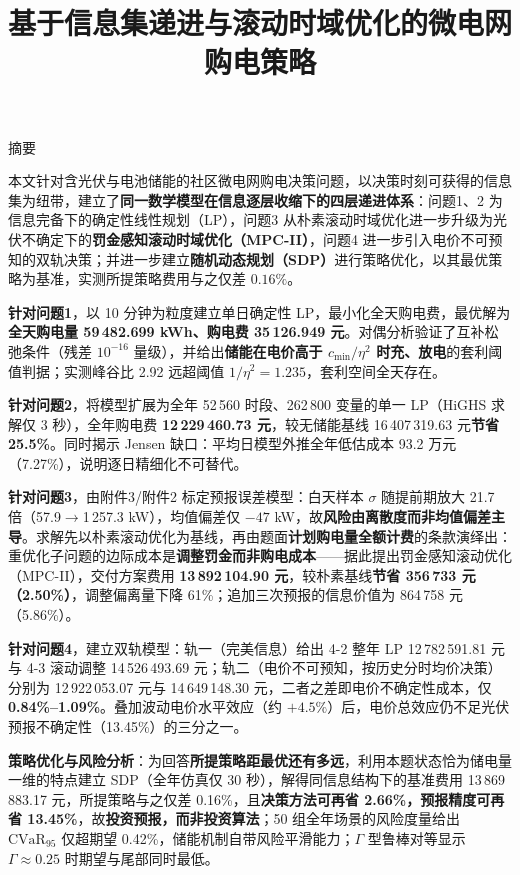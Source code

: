 \documentclass[11pt,a4paper]{ctexart}
\title{\heiti 基于信息集递进与滚动时域优化的微电网购电策略}
\author{}
\date{}
\newcommand{\CVaR}{\mathrm{CVaR}}
\begin{document}
\maketitle
\vspace{-3.5em}

\begin{center}{\large\heiti 摘\quad 要}\end{center}

本文针对含光伏与电池储能的社区微电网购电决策问题，以决策时刻可获得的信息集为纽带，建立了\textbf{同一数学模型在信息逐层收缩下的四层递进体系}：问题1、2 为信息完备下的确定性线性规划（LP），问题3 从朴素滚动时域优化进一步升级为光伏不确定下的\textbf{罚金感知滚动时域优化（MPC-II）}，问题4 进一步引入电价不可预知的双轨决策；并进一步建立\textbf{随机动态规划（SDP）}进行策略优化，以其最优策略为基准，实测所提策略费用与之仅差 $0.16\%$。

\textbf{针对问题1}，以 10 分钟为粒度建立单日确定性 LP，最小化全天购电费，最优解为\textbf{全天购电量 59\,482.699 kWh、购电费 35\,126.949 元}。对偶分析验证了互补松弛条件（残差 $10^{-16}$ 量级），并给出\textbf{储能在电价高于 $c_{\min}/\eta^2$ 时充、放电}的套利阈值判据；实测峰谷比 2.92 远超阈值 $1/\eta^2=1.235$，套利空间全天存在。

\textbf{针对问题2}，将模型扩展为全年 52\,560 时段、262\,800 变量的单一 LP（HiGHS 求解仅 3 秒），全年购电费 \textbf{12\,229\,460.73 元}，较无储能基线 16\,407\,319.63 元\textbf{节省 25.5\%}。同时揭示 Jensen 缺口：平均日模型外推全年低估成本 93.2 万元（7.27\%），说明逐日精细化不可替代。

\textbf{针对问题3}，由附件3/附件2 标定预报误差模型：白天样本 $\sigma$ 随提前期放大 21.7 倍（57.9$\to$1\,257.3 kW），均值偏差仅 $-47$ kW，故\textbf{风险由离散度而非均值偏差主导}。求解先以朴素滚动优化为基线，再由题面\textbf{计划购电量全额计费}的条款演绎出：重优化子问题的边际成本是\textbf{调整罚金而非购电成本}——据此提出罚金感知滚动优化（MPC-II），交付方案费用 \textbf{13\,892\,104.90 元}，较朴素基线\textbf{节省 356\,733 元（2.50\%）}，调整偏离量下降 61\%；追加三次预报的信息价值为 864\,758 元（5.86\%）。

\textbf{针对问题4}，建立双轨模型：轨一（完美信息）给出 4-2 整年 LP 12\,782\,591.81 元与 4-3 滚动调整 14\,526\,493.69 元；轨二（电价不可预知，按历史分时均价决策）分别为 12\,922\,053.07 元与 14\,649\,148.30 元，二者之差即电价不确定性成本，仅 \textbf{0.84\%--1.09\%}。叠加波动电价水平效应（约 $+4.5\%$）后，电价总效应仍不足光伏预报不确定性（13.45\%）的三分之一。

\textbf{策略优化与风险分析}：为回答\textbf{所提策略距最优还有多远}，利用本题状态恰为储电量一维的特点建立 SDP（全年仿真仅 30 秒），解得同信息结构下的基准费用 13\,869\,883.17 元，所提策略与之仅差 0.16\%，且\textbf{决策方法可再省 2.66\%，预报精度可再省 13.45\%}，故\textbf{投资预报，而非投资算法}；50 组全年场景的风险度量给出 $\CVaR_{95}$ 仅超期望 0.42\%，储能机制自带风险平滑能力；$\Gamma$ 型鲁棒对等显示 $\Gamma\approx0.25$ 时期望与尾部同时最低。
\end{document}
